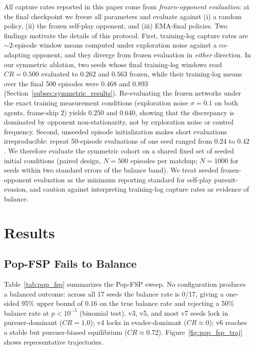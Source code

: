 \documentclass[letterpaper, 10pt, journal]{IEEEtran}
\begin{document}
All capture rates reported in this paper come from \emph{frozen-opponent evaluation}: at the final checkpoint we freeze all parameters and evaluate against (i) a random policy, (ii) the frozen self-play opponent, and (iii) EMA-final policies. Two findings motivate the details of this protocol. First, training-log capture rates are ${\sim}2$-episode window means computed under exploration noise against a co-adapting opponent, and they diverge from frozen evaluation in \emph{either} direction. In our symmetric ablation, two seeds whose final training-log windows read $CR{=}0.500$ evaluated to $0.262$ and $0.563$ frozen, while their training-log means over the final 500 episodes were $0.468$ and $0.893$ (Section~\ref{subsec:symmetric_results}). Re-evaluating the frozen networks under the exact training measurement conditions (exploration noise $\sigma{=}0.1$ on both agents, frame-skip 2) yields $0.250$ and $0.640$, showing that the discrepancy is dominated by opponent non-stationarity, not by exploration noise or control frequency. Second, unseeded episode initialization makes short evaluations irreproducible: repeat 50-episode evaluations of one seed ranged from $0.24$ to $0.42$. We therefore evaluate the symmetric cohort on a shared fixed set of seeded initial conditions (paired design, $N{=}500$ episodes per matchup; $N{=}1000$ for seeds within two standard errors of the balance band). We treat seeded frozen-opponent evaluation as the minimum reporting standard for self-play pursuit-evasion, and caution against interpreting training-log capture rates as evidence of balance.

\section{Results}
\label{sec:results}

\subsection{Pop-FSP Fails to Balance}
\label{subsec:pop_fsp_results}

Table~\ref{tab:pop_fsp} summarizes the Pop-FSP sweep. No configuration produces a balanced outcome: across all 17 seeds the balance rate is 0/17, giving a one-sided 95\% upper bound of $0.16$ on the true balance rate and rejecting a 50\% balance rate at $p < 10^{-5}$ (binomial test). v3, v5, and most v7 seeds lock in pursuer-dominant ($CR=1.0$); v4 locks in evader-dominant ($CR\approx 0$); v6 reaches a stable but pursuer-biased equilibrium ($CR\approx 0.72$). Figure~\ref{fig:pop_fsp_traj} shows representative trajectories.
\end{document}
